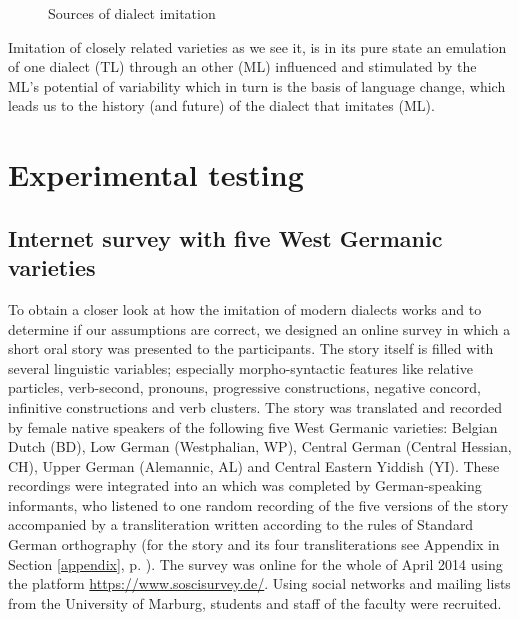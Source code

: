 \documentclass[output=paper]{LSP/langsci}
\begin{document}
\begin{figure}[htbp]
 \begin{center}
              \caption{Sources of dialect imitation}\label{imitationalssubtraktiveFarbmischung}	%
\end{center}
 \end{figure}


 
Imitation of closely related varieties as we see it, is in its pure state an emulation of one dialect (TL) through an other (ML) influenced and stimulated by the ML's potential of variability which in turn is the basis of language change, which leads us to the history (and future) of the dialect that imitates (ML).

 \section{Experimental testing}\label{experiment}
 
 
 \subsection{Internet survey with five West Germanic varieties }\label{online}

To obtain a closer look at how the imitation of modern dialects works and to determine if our assumptions are correct, we designed an online survey in which a short oral story was presented to the participants. The story itself is filled with several linguistic variables; especially morpho-syntactic features like relative particles, verb-second, pronouns, progressive constructions, negative concord, infinitive constructions and verb clusters. The story was translated and recorded by female native speakers of the following five West Germanic varieties: Belgian Dutch (BD), Low German (Westphalian, WP), Central German (Central Hessian, CH), Upper German (Alemannic, AL) and Central Eastern Yiddish (YI). These recordings were integrated into an  which was completed by German-speaking informants, who listened to one random recording of the five versions of the story accompanied by a transliteration written according to the rules of Standard German orthography (for the story and its four transliterations see Appendix in Section \ref{appendix}, p. \pageref{appendix}). The survey was online for the whole of April 2014 using the platform \url{https://www.soscisurvey.de/}. Using social networks and mailing lists from the University of Marburg, students and staff of the faculty were recruited.
\end{document}
